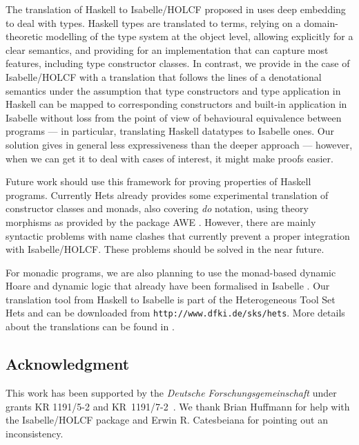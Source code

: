 \documentclass{llncs}
\begin{document}
The translation of Haskell to Isabelle/HOLCF proposed in \cite{Huff}
uses deep embedding to deal with types.  Haskell types are translated
to terms, relying on a domain-theoretic modelling of the type system
at the object level, allowing explicitly for a clear semantics, and
providing for an implementation that can capture most features,
including type constructor classes.  In contrast, we provide in the
case of Isabelle/HOLCF with a translation that follows the lines of a
denotational semantics under the assumption that type constructors and
type application in Haskell can be mapped to corresponding
constructors and built-in application in Isabelle without loss from
the point of view of behavioural equivalence between programs --- in
particular, translating Haskell datatypes to Isabelle ones.  Our
solution gives in general less expressiveness than the deeper approach
--- however, when we can get it to deal with cases of interest, it
might make proofs easier.



Future work should use this framework for proving properties of
Haskell programs.  Currently Hets already provides some experimental
translation of constructor classes and monads, also covering \emph{do}
notation, using theory morphisms as provided by the package AWE
\cite{AWE}. However, there are mainly syntactic problems with name
clashes that currently prevent a proper integration with
Isabelle/HOLCF. These problems should be solved in the near future.

For monadic programs, we are also planning to use the monad-based
dynamic Hoare and dynamic logic that already have been formalised in
Isabelle \cite{Walter05}. Our translation tool from Haskell to
Isabelle is part of the Heterogeneous Tool Set Hets and can be
downloaded from \texttt{http://www.dfki.de/sks/hets}. More details
about the translations can be found in \cite{Tlmm}.



\subsection*{Acknowledgment}
This work has been supported by the {\em Deutsche
  Forschungsgemeinschaft} under grants KR \mbox{1191/5-2} and \mbox{KR
  1191/7-2 }. We thank Brian Huffmann for help with the Isabelle/HOLCF
package and Erwin R. Catesbeiana for pointing out an inconsistency.

 
\end{document}
